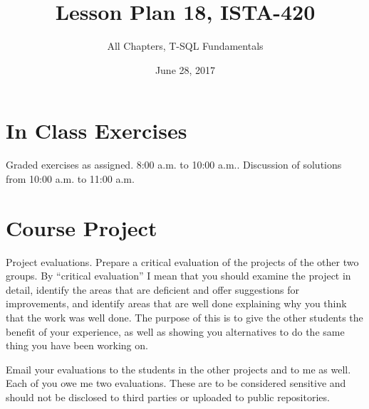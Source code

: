 \documentclass{article}
\title{Lesson Plan 18, ISTA-420}
\author{All Chapters, T-SQL Fundamentals}
\date{June 28, 2017}
\begin{document}
    

    \maketitle{}


    \section{In Class Exercises}

    Graded exercises as assigned. 8:00 a.m. to 10:00 a.m.. Discussion of solutions from 10:00 a.m. to 11:00 a.m.

    \section{Course Project}

    Project evaluations. Prepare a critical evaluation of the projects of the other two groups. By ``critical evaluation'' I mean that you should examine the project in detail, identify the areas that are deficient and offer suggestions for improvements, and identify areas that are well done explaining why you think that the work was well done. The purpose of this is to give the other students the benefit of your experience, as well as showing you alternatives to do the same thing you have been working on.

    Email your evaluations to the students in the other projects and to me as well. Each of you owe me two evaluations. These are to be considered sensitive and should not be disclosed to third parties or uploaded to public repositories.
\end{document}
